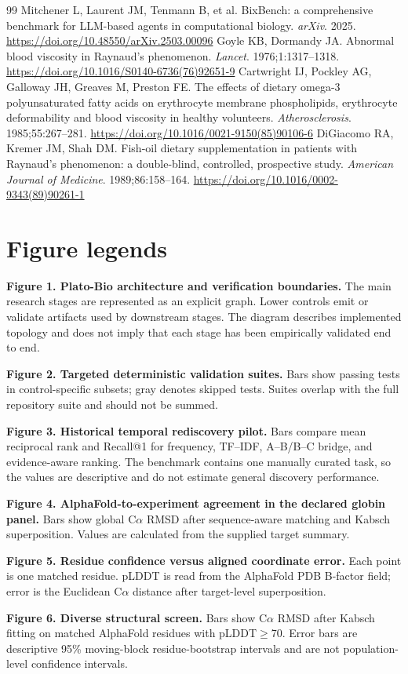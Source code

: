 \documentclass[11pt]{article}
\begin{document}
\begin{thebibliography}{99}
 Mitchener L, Laurent JM, Tenmann B, et al. BixBench: a comprehensive benchmark for LLM-based agents in computational biology. \emph{arXiv}. 2025. \url{https://doi.org/10.48550/arXiv.2503.00096}
 Goyle KB, Dormandy JA. Abnormal blood viscosity in Raynaud's phenomenon. \emph{Lancet}. 1976;1:1317--1318. \url{https://doi.org/10.1016/S0140-6736(76)92651-9}
 Cartwright IJ, Pockley AG, Galloway JH, Greaves M, Preston FE. The effects of dietary omega-3 polyunsaturated fatty acids on erythrocyte membrane phospholipids, erythrocyte deformability and blood viscosity in healthy volunteers. \emph{Atherosclerosis}. 1985;55:267--281. \url{https://doi.org/10.1016/0021-9150(85)90106-6}
 DiGiacomo RA, Kremer JM, Shah DM. Fish-oil dietary supplementation in patients with Raynaud's phenomenon: a double-blind, controlled, prospective study. \emph{American Journal of Medicine}. 1989;86:158--164. \url{https://doi.org/10.1016/0002-9343(89)90261-1}
\end{thebibliography}

\section{Figure legends}

\textbf{Figure 1. Plato-Bio architecture and verification boundaries.} The main research stages are represented as an explicit graph. Lower controls emit or validate artifacts used by downstream stages. The diagram describes implemented topology and does not imply that each stage has been empirically validated end to end.

\textbf{Figure 2. Targeted deterministic validation suites.} Bars show passing tests in control-specific subsets; gray denotes skipped tests. Suites overlap with the full repository suite and should not be summed.

\textbf{Figure 3. Historical temporal rediscovery pilot.} Bars compare mean reciprocal rank and Recall@1 for frequency, TF--IDF, A--B/B--C bridge, and evidence-aware ranking. The benchmark contains one manually curated task, so the values are descriptive and do not estimate general discovery performance.

\textbf{Figure 4. AlphaFold-to-experiment agreement in the declared globin panel.} Bars show global C$\alpha$ RMSD after sequence-aware matching and Kabsch superposition. Values are calculated from the supplied target summary.

\textbf{Figure 5. Residue confidence versus aligned coordinate error.} Each point is one matched residue. pLDDT is read from the AlphaFold PDB B-factor field; error is the Euclidean C$\alpha$ distance after target-level superposition.

\textbf{Figure 6. Diverse structural screen.} Bars show C$\alpha$ RMSD after Kabsch fitting on matched AlphaFold residues with pLDDT$\geq$70. Error bars are descriptive 95\% moving-block residue-bootstrap intervals and are not population-level confidence intervals.
\end{document}
